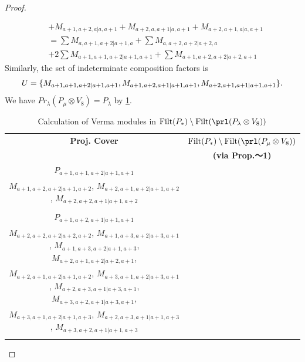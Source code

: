 \begin{proof}
\begin{enumerate}
\begin{enumerate}
\begin{equation}
\begin{aligned}
                                              &
+ M_{a+1,a+2,a|a,a+1}
+ M_{a+2,a,a+1|a,a+1}
+ M_{a+2,a+1,a|a,a+1} \\
                                               &=
\sum M_{a,a+1,a+2|a+1,a}
+ \sum M_{a,a+2,a+2|a+2,a}\\
                                              &
+ 2\sum M_{a+1,a+1,a+2|a+1,a+1}
+ \sum M_{a+1,a+2,a+2|a+2,a+1}
          \end{aligned}
        \end{equation}
      Similarly, the set of indeterminate composition factors is 
\begin{equation}\notag
  \begin{aligned}
    U = \{
M_{a+1,a+1,a+2|a+1,a+1},
M_{a+1,a+2,a+1|a+1,a+1},
M_{a+2,a+1,a+1|a+1,a+1}
\}.
  \end{aligned}
\end{equation}
       We have $Pr_{\lambda}(P_\mu \otimes V_{8}) = P_\lambda  $ by \cref{tab:verma-analysis_d_9}.
\begin{table}[htbp]
\centering
\caption{Calculation of Verma modules in $\operatorname{Filt}(P_*) \setminus \operatorname{Filt}(\prl(P_\lambda \otimes V_{8})) $ } \label{tab:verma-analysis_d_9}
\begin{tabular}{cc}
\toprule
\textbf{Proj. Cover} & \textbf{$\operatorname{Filt}(P_*) \setminus \operatorname{Filt}(\prl(P_\mu \otimes V_{8})) $}  \\
     & \textbf{(via Prop.～1)}  \\
\midrule
 $P_{a+1,a+1,a+2|a+1,a+1}$ & \makecell{
 $M_{a+2,a+2,a+2|a+2,a+2}$,
 $M_{a+1,a+2,a+2|a+2,a+1}$,
 $M_{a+2,a+1,a+2|a+2,a+1}$,
 $M_{a+2,a+2,a+1|a+2,a+1}$, \\
 $M_{a+1,a+2,a+2|a+1,a+2}$,
 $M_{a+2,a+1,a+2|a+1,a+2}$,
 $M_{a+2,a+2,a+1|a+1,a+2}$
}\\
 & \\
 $P_{a+1,a+2,a+1|a+1,a+1}$ & \makecell{
 $M_{a+2,a+2,a+1|a+2,a+1}$,
 $M_{a+2,a+2,a+1|a+1,a+2}$,
 $M_{a+1,a+2,a+2|a+2,a+1}$,
 $M_{a+1,a+2,a+2|a+1,a+2}$, \\
 $M_{a+2,a+2,a+2|a+2,a+2}$,
 $M_{a+1,a+3,a+2|a+3,a+1}$,
 $M_{a+1,a+3,a+2|a+1,a+3}$,
 $M_{a+2,a+1,a+2|a+2,a+1}$, \\
 $M_{a+2,a+1,a+2|a+1,a+2}$,
 $M_{a+3,a+1,a+2|a+3,a+1}$,
 $M_{a+2,a+3,a+1|a+3,a+1}$,
 $M_{a+3,a+2,a+1|a+3,a+1}$, \\
 $M_{a+3,a+1,a+2|a+1,a+3}$,
 $M_{a+2,a+3,a+1|a+1,a+3}$,
 $M_{a+3,a+2,a+1|a+1,a+3}$
}\\
 & \\

\end{tabular}
\end{table}
\end{enumerate}
\end{enumerate}
\end{proof}

